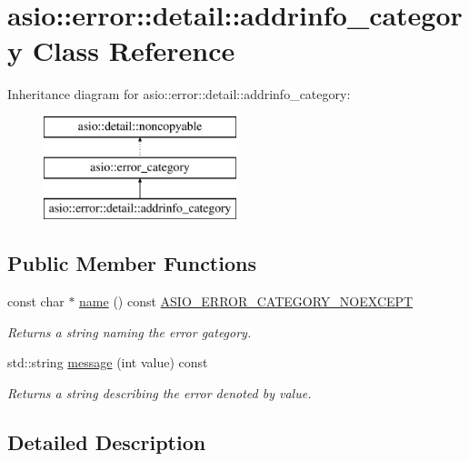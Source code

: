 \hypertarget{classasio_1_1error_1_1detail_1_1addrinfo__category}{}\section{asio\+:\+:error\+:\+:detail\+:\+:addrinfo\+\_\+category Class Reference}
\label{classasio_1_1error_1_1detail_1_1addrinfo__category}
Inheritance diagram for asio\+:\+:error\+:\+:detail\+:\+:addrinfo\+\_\+category\+:\begin{figure}[H]
\begin{center}
\leavevmode
\includegraphics[height=3.000000cm]{classasio_1_1error_1_1detail_1_1addrinfo__category}
\end{center}
\end{figure}
\subsection*{Public Member Functions}
\begin{DoxyCompactItemize}
\item 
const char $\ast$ \hyperlink{classasio_1_1error_1_1detail_1_1addrinfo__category_a37ddd0b7afca29302593a7142b8efd19}{name} () const \hyperlink{config_8hpp_a1e51af6137c0e4e4d686921037649e74}{A\+S\+I\+O\+\_\+\+E\+R\+R\+O\+R\+\_\+\+C\+A\+T\+E\+G\+O\+R\+Y\+\_\+\+N\+O\+E\+X\+C\+E\+P\+T}
\begin{DoxyCompactList}\small\item\em Returns a string naming the error gategory. \end{DoxyCompactList}\item 
std\+::string \hyperlink{classasio_1_1error_1_1detail_1_1addrinfo__category_a980a14ab997f59f6192c9197662d06b2}{message} (int value) const 
\begin{DoxyCompactList}\small\item\em Returns a string describing the error denoted by {\ttfamily value}. \end{DoxyCompactList}\end{DoxyCompactItemize}


\subsection{Detailed Description}


